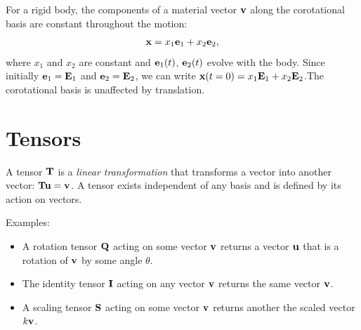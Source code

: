 \documentclass[
  letterpaper,
  DIV=11,
  numbers=noendperiod]{scrreprt}
\begin{document}
For a rigid body, the components of a material vector \({\bf v}\) along
the corotational basis are constant throughout the motion: \begin{align}
    {\bf x} = x_1{\bf e}_1+x_2{\bf e}_2,
\end{align} where \(x_1\) and \(x_2\) are constant and \({\bf e}_1(t)\),
\({\bf e}_2(t)\) evolve with the body. Since initially
\({\bf e}_1 = {\bf E}_1\) and \({\bf e}_2 = {\bf E}_2\), we can write
\({\bf x}(t=0) = x_1{\bf E}_1+x_2{\bf E}_2\).The corotational basis is
unaffected by translation.

\section{Tensors}\label{tensors}

A tensor \({\bf T}\) is a \emph{linear transformation} that transforms a
vector into another vector: \({\bf T}{\bf u} = {\bf v}\). A tensor
exists independent of any basis and is defined by its action on vectors.

Examples:

\begin{itemize}
\item
  A rotation tensor \({\bf Q}\) acting on some vector \({\bf v}\)
  returns a vector \({\bf u}\) that is a rotation of \({\bf v}\) by some
  angle \(\theta\).
\item
  The identity tensor \({\bf I}\) acting on any vector \({\bf v}\)
  returns the same vector \({\bf v}\).
\item
  A scaling tensor \({\bf S}\) acting on some vector \({\bf v}\) returns
  another the scaled vector \(k{\bf v}\).
\end{itemize}
\end{document}
